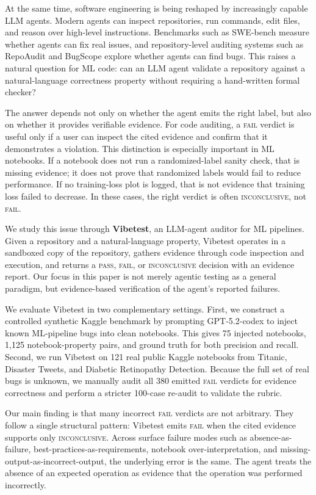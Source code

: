 \documentclass[11pt]{article}
\begin{document}
At the same time, software engineering is being reshaped by increasingly capable LLM agents.
Modern agents can inspect repositories, run commands, edit files, and reason over high-level instructions.
Benchmarks such as SWE-bench \citep{jimenez2024swebench} measure whether agents can fix real issues, and repository-level auditing systems such as RepoAudit \citep{guo2025repoaudit} and BugScope \citep{liu2025bugscope} explore whether agents can find bugs.
This raises a natural question for ML code: can an LLM agent validate a repository against a natural-language correctness property without requiring a hand-written formal checker?

The answer depends not only on whether the agent emits the right label, but also on whether it provides verifiable evidence.
For code auditing, a \textsc{fail} verdict is useful only if a user can inspect the cited evidence and confirm that it demonstrates a violation.
This distinction is especially important in ML notebooks.
If a notebook does not run a randomized-label sanity check, that is missing evidence; it does not prove that randomized labels would fail to reduce performance.
If no training-loss plot is logged, that is not evidence that training loss failed to decrease.
In these cases, the right verdict is often \textsc{inconclusive}, not \textsc{fail}.

We study this issue through \textbf{Vibetest}, an LLM-agent auditor for ML pipelines.
Given a repository and a natural-language property, Vibetest operates in a sandboxed copy of the repository, gathers evidence through code inspection and execution, and returns a \textsc{pass}, \textsc{fail}, or \textsc{inconclusive} decision with an evidence report.
Our focus in this paper is not merely agentic testing as a general paradigm, but evidence-based verification of the agent's reported failures.

We evaluate Vibetest in two complementary settings.
First, we construct a controlled synthetic Kaggle benchmark by prompting GPT-5.2-codex to inject known ML-pipeline bugs into clean notebooks.
This gives 75 injected notebooks, 1,125 notebook-property pairs, and ground truth for both precision and recall.
Second, we run Vibetest on 121 real public Kaggle notebooks from Titanic, Disaster Tweets, and Diabetic Retinopathy Detection.
Because the full set of real bugs is unknown, we manually audit all 380 emitted \textsc{fail} verdicts for evidence correctness and perform a stricter 100-case re-audit to validate the rubric.

Our main finding is that many incorrect \textsc{fail} verdicts are not arbitrary.
They follow a single structural pattern: Vibetest emits \textsc{fail} when the cited evidence supports only \textsc{inconclusive}.
Across surface failure modes such as absence-as-failure, best-practices-as-requirements, notebook over-interpretation, and missing-output-as-incorrect-output, the underlying error is the same.
The agent treats the absence of an expected operation as evidence that the operation was performed incorrectly.
\end{document}
